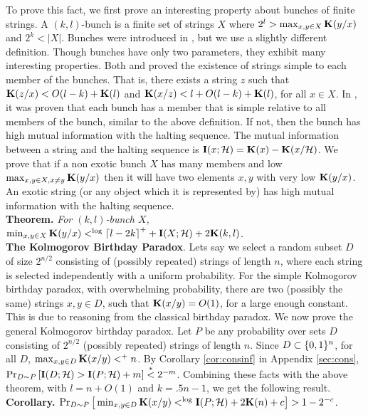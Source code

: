 \documentclass[11pt]{article}\textwidth 6.5in\textheight 9in
\begin{document}
To prove this fact, we first prove an interesting property about bunches of finite strings. A $(k,l)$-bunch is a finite set of strings $X$ where $2^l>\max_{x,y\in X} {\mathbf K}(y/x)$ and $2^k<|X|$. Bunches were introduced in \citep{Romashchenko03}, but we use a slightly different definition. Though bunches have only two parameters, they exhibit many interesting properties.  Both \citep{Romashchenko03}  and \citep{Romashckenko22} proved the existence of strings simple to each member of the bunches. That is, there exists a string $z$ such that ${\mathbf K}(z/x)<O(l-k)+{\mathbf K}(l)$ and ${\mathbf K}(x/z)<l+O(l-k)+{\mathbf K}(l)$, for all $x\in X$. In \citep{EpsteinBunch21}, it was proven that each bunch has a member that is simple relative to all members of the bunch, similar to the above definition.
If not, then the bunch has high mutual information with the halting sequence.  The mutual information between a string and the halting sequence is ${\mathbf I}(x;\mathcal{H})={\mathbf K}(x)-{\mathbf K}(x/\mathcal{H})$. 
We prove that if a non exotic bunch $X$ has many members and low $\max_{x,y\in X,x\neq y}{\mathbf K}(y/x)$ then it will have two elements $x,y$ with very low ${\mathbf K}(y/x)$. An exotic string (or any object which it is represented by) has high mutual information with the halting sequence. \\

\noindent\textbf{Theorem. }\textit{For $(k,l)$-bunch $X$, $\min_{x,y\in X}{\mathbf K}(y/x)<^{\log} {\lceil l-2k\rceil}^++{\mathbf I}(X;{\mathcal H})+2{\mathbf K}(k,l)$.}\\

\noindent\textbf{The Kolmogorov Birthday Paradox}. Lets say we select a random subset $D$ of size $2^{n/2}$ consisting of (possibly repeated) strings of length $n$, where each string is selected independently with a uniform probability. For the simple Kolmogorov birthday paradox, with overwhelming probability, there are two (possibly the same) strings $x,y\in D$, such that ${\mathbf K}(x/y)=O(1)$, for a large enough constant. This is due to reasoning from the classical birthday paradox. We now prove the general Kolmogorov birthday paradox. Let $P$ be any probability over sets $D$ consisting of $2^{n/2}$ (possibly repeated) strings of length $n$. Since $D\subset \{0,1\}^n$, for all $D$, $\max_{x,y\in D}{\mathbf K}(x/y)<^+ n$. By Corollary \ref{cor:consinf} in Appendix \ref{sec:cons}, $\Pr_{D\sim P}\left[{\mathbf I}(D;{\mathcal H})>{\mathbf I}(P;{\mathcal H})+m\right]\stackrel{\ast}{<} 2^{-m}$. Combining these facts with the above theorem, with $l=n+O(1)$ and $k=.5n-1$, we get the following result.  \\

\noindent\textbf{Corollary. } $\Pr_{D\sim P}\big[\min_{x,y\in D}{\mathbf K}(x/y)<^{\log} {\mathbf I}(P;{\mathcal H})+2{\mathbf K}(n)+c\big] > 1-2^{-c}$.\\
\end{document}
